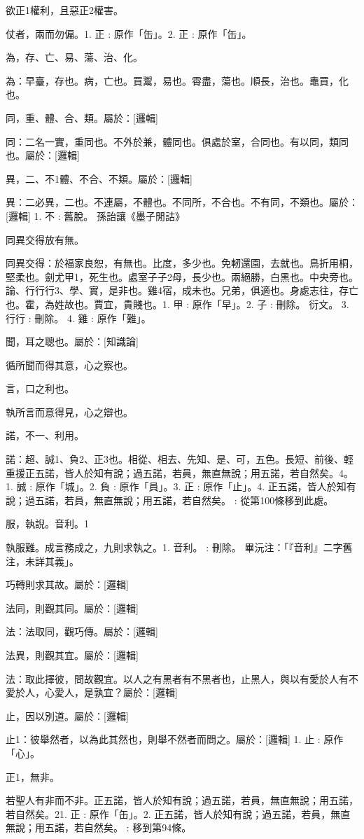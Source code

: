 \begin{pinyinscope}
欲正1權利，且惡正2權害。

仗者，兩而勿偏。1. 正 : 原作「缶」。2. 正 : 原作「缶」。

為，存、亡、易、蕩、治、化。

為：早臺，存也。病，亡也。買鬻，易也。霄盡，蕩也。順長，治也。鼃買，化也。

同，重、體、合、類。屬於：[邏輯]

同：二名一實，重同也。不外於兼，體同也。俱處於室，合同也。有以同，類同也。屬於：[邏輯]

異，二、不1體、不合、不類。屬於：[邏輯]

異：二必異，二也。不連屬，不體也。不同所，不合也。不有同，不類也。屬於：[邏輯] 
1. 不 : 舊脫。  孫詒讓《墨子閒詁》

同異交得放有無。

同異交得：於福家良恕，有無也。比度，多少也。免軔還園，去就也。鳥折用桐，堅柔也。劍尤甲1，死生也。處室子子2母，長少也。兩絕勝，白黑也。中央旁也。論、行行行3、學、實，是非也。雞4宿，成未也。兄弟，俱適也。身處志往，存亡也。霍，為姓故也。賈宜，貴賤也。1. 甲 : 原作「早」。2. 子 : 刪除。 衍文。 3. 行行 : 刪除。  4. 雞 : 原作「難」。

聞，耳之聰也。屬於：[知識論]



循所聞而得其意，心之察也。



言，口之利也。



執所言而意得見，心之辯也。



諾，不一、利用。

諾：超、誠1、負2、正3也。相從、相去、先知、是、可，五色。長短、前後、輕重援正五諾，皆人於知有說；過五諾，若員，無直無說；用五諾，若自然矣。4。1. 誠 : 原作「城」。2. 負 : 原作「員」。3. 正 : 原作「止」。4. 正五諾，皆人於知有說；過五諾，若員，無直無說；用五諾，若自然矣。 : 從第100條移到此處。

服，執誽。音利。1

執服難。成言務成之，九則求執之。1. 音利。 : 刪除。 畢沅注：「『音利』二字舊注，未詳其義」。

巧轉則求其故。屬於：[邏輯]



法同，則觀其同。屬於：[邏輯]

法：法取同，觀巧傳。屬於：[邏輯]

法異，則觀其宜。屬於：[邏輯]

法：取此擇彼，問故觀宜。以人之有黑者有不黑者也，止黑人，與以有愛於人有不愛於人，心愛人，是孰宜？屬於：[邏輯]

止，因以別道。屬於：[邏輯]

止1：彼舉然者，以為此其然也，則舉不然者而問之。屬於：[邏輯] 
1. 止 : 原作「心」。

正1，無非。

若聖人有非而不非。正五諾，皆人於知有說；過五諾，若員，無直無說；用五諾，若自然矣。21. 正 : 原作「缶」。2. 正五諾，皆人於知有說；過五諾，若員，無直無說；用五諾，若自然矣。 : 移到第94條。


\end{pinyinscope}